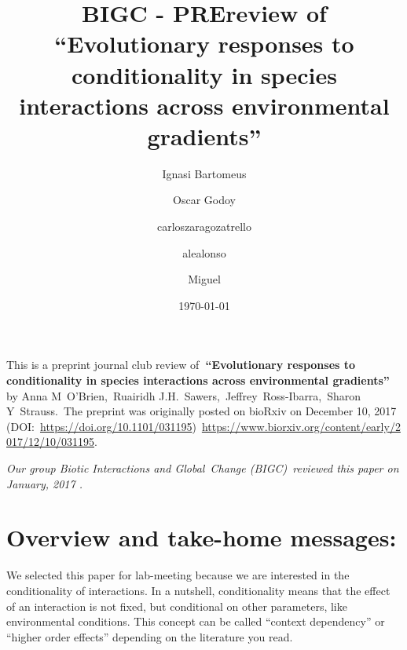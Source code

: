 \documentclass[10pt]{article}
\renewenvironment{abstract}
  {{\bfseries\noindent{\abstractname}\par\nobreak}\footnotesize}
  {\bigskip}
\begin{document}
\title{BIGC - PREreview of ``Evolutionary responses to conditionality in
species interactions across environmental gradients''}



\author[1]{Ignasi Bartomeus}%
\author[2]{Oscar Godoy}%
\author[2]{carloszaragozatrello}%
\author[2]{alealonso}%
\author[2]{Miguel}%
%
%


\vspace{-1em}



  \date{\today}


\begingroup
\let\center\flushleft
\let\endcenter\endflushleft
\maketitle
\endgroup





\begin{abstract}
This is a preprint journal club review of\textbf{~``Evolutionary
responses to conditionality in species interactions across environmental
gradients''} by Anna M~O'Brien,~Ruairidh
J.H.~Sawers,~Jeffrey~Ross-Ibarra,~Sharon Y~Strauss.~The preprint was
originally posted on bioRxiv on December 10, 2017
(DOI:~\href{https://doi.org/10.1101/124750}{https://doi.org/10.1101/031195})~\url{https://www.biorxiv.org/content/early/2017/12/10/031195}.

\emph{Our group Biotic Interactions and Global~Change
(BIGC)}~\emph{reviewed this paper on January, 2017 .}%
\end{abstract}%




\section*{Overview and take-home
messages:}

{\label{334195}}

We selected this paper for lab-meeting because we are interested in the
conditionality of interactions. In a nutshell, conditionality means that
the effect of an interaction is not fixed, but conditional on other
parameters, like environmental conditions. This concept can be called
``context dependency'' or ``higher order effects'' depending on the
literature you read.~

\par\null
\end{document}
